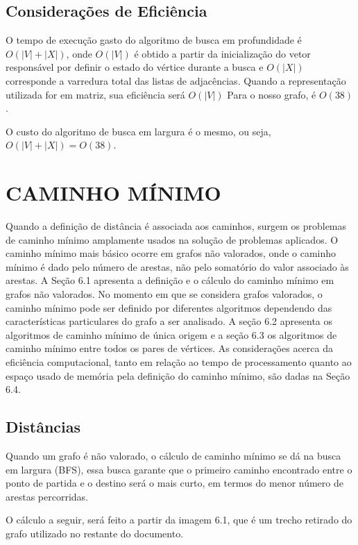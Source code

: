 \section{Considerações de Eficiência}\label{sec:eficienciaBusca}

O tempo de execução gasto do algoritmo de busca em profundidade é $ O(|V|+|X|) $, onde $ O(|V|) $ é obtido a partir da inicialização do vetor responsável por definir o estado do vértice durante a busca e $ O(|X|) $ corresponde a varredura total das listas de adjacências. Quando a representação utilizada for em matriz, sua eficiência será $ O(|V|) $
Para o nosso grafo, é $ O(38) $.

O custo do algoritmo de busca em largura é o mesmo, ou seja, $ O(|V| + |X|) = O(38) $.


\chapter{CAMINHO MÍNIMO}\label{cap:caminhoMinimo}
Quando a definição de distância é associada aos caminhos, surgem os problemas de
caminho mínimo amplamente usados na solução de problemas aplicados. O caminho mínimo
mais básico ocorre em grafos não valorados, onde o caminho mínimo é dado pelo número de
arestas, não pelo somatório do valor associado às arestas. A Seção 6.1 apresenta a definição
e o cálculo do caminho mínimo em grafos não valorados.
No momento em que se considera grafos valorados, o caminho mínimo pode ser definido por diferentes algoritmos dependendo das características particulares do grafo a ser analisado. A seção 6.2 apresenta os algoritmos de caminho mínimo de única origem e a seção 6.3
os algoritmos de caminho mínimo entre todos os pares de vértices. As considerações acerca
da eficiência computacional, tanto em relação ao tempo de processamento quanto ao espaço
usado de memória pela definição do caminho mínimo, são dadas na Seção 6.4.

\section{Distâncias}\label{sec:dist}
Quando um grafo é não valorado, o cálculo de caminho mínimo se dá na busca em largura (BFS), essa busca garante que o primeiro caminho encontrado entre o ponto de partida e o destino será o mais curto, em termos do menor número de arestas percorridas.

O cálculo a seguir, será feito a partir da imagem 6.1, que é um trecho retirado do grafo utilizado no restante do documento.

